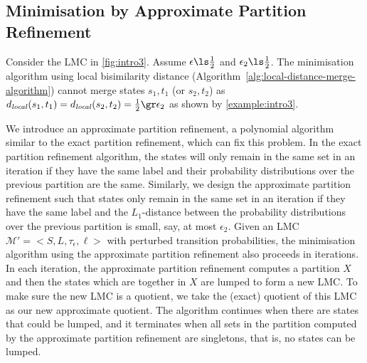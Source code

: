 \documentclass[a4paper,UKenglish,cleveref,autoref,thm-restate]{lipics-v2021}
\newcommand{\local}{\mathit{local}}
\newcommand{\Hyp}{\mathcal{M}'}%
\newcommand{\tauHyp}{\tau_{\epsilon}}
\begin{document}
\subsection{Minimisation by Approximate Partition Refinement}\label{subsection:approximate-partition-refinement}
Consider the LMC in \cref{fig:intro3}. Assume $\epsilon \ls \frac{1}{2}$ and $\epsilon_2 \ls \frac{1}{2}$. The minimisation algorithm using local bisimilarity distance (Algorithm~\ref{alg:local-distance-merge-algorithm}) cannot merge states $s_1, t_1$ (or $s_2, t_2$) as $d_{\local}(s_1, t_1) = d_{\local}(s_2, t_2)  =\frac{1}{2} \gr \epsilon_2$ as shown by \cref{example:intro3}.

We introduce an approximate partition refinement, a polynomial algorithm similar to the exact partition refinement, which can fix this problem. In the exact partition refinement algorithm, the states will only remain in the same set in an iteration if they have the same label and their probability distributions over the previous partition are the same. Similarly, we design the approximate partition refinement such that states only remain in the same set in an iteration if they have the same label and the $L_1$-distance between the probability distributions over the previous partition is small, say, at most $\epsilon_2$. Given an LMC $\Hyp = <S, L, \tauHyp, \ell>$ with perturbed transition probabilities, the minimisation algorithm using the approximate partition refinement also proceeds in iterations. In each iteration, the approximate partition refinement computes a partition $X$ and then the states which are together in $X$ are  lumped to form a new LMC. To make sure the new LMC is a quotient, we take the (exact) quotient of this LMC as our new approximate quotient. The algorithm continues when there are states that could be lumped, and it terminates when all sets in the partition computed by the approximate partition refinement are singletons, that is, no states can be lumped. %
\end{document}
